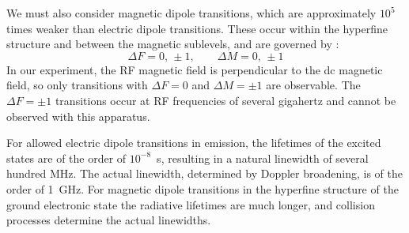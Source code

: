 We must also consider magnetic dipole transitions, which are approximately $10^5$ times
weaker than electric dipole transitions. These occur within the hyperfine structure and
between the magnetic sublevels, and are governed by :
\begin{equation}
    \Delta F = 0,\,\pm 1,
    \qquad
    \Delta M = 0,\,\pm 1
    \label{eq:mag_dipole_selection}
\end{equation}
In our experiment, the RF magnetic field is perpendicular to the dc magnetic field, so only
transitions with $\Delta F = 0$ and $\Delta M = \pm 1$ are observable. The $\Delta F = \pm 1$
transitions occur at RF frequencies of several gigahertz and cannot be observed with this
apparatus.
 
For allowed electric dipole transitions in emission, the lifetimes of the excited states are
of the order of $10^{-8}$~s, resulting in a natural linewidth of several hundred MHz. The
actual linewidth, determined by Doppler broadening, is of the order of 1~GHz. For
magnetic dipole transitions in the hyperfine structure of the ground electronic state the
radiative lifetimes are much longer, and collision processes determine the actual linewidths.
 
